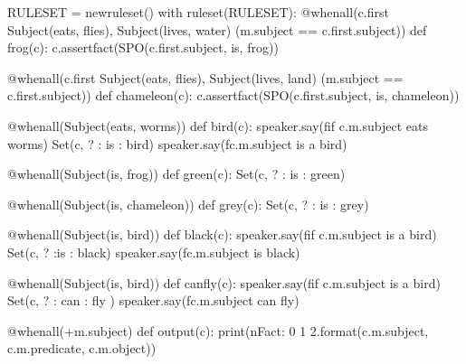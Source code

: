 \documentclass[letterpaper,10pt,english]{sphinxmanual}
\begin{document}
{
\begin{sphinxVerbatim}[commandchars=\\\{\}]
\llap{\color{nbsphinxin}[ ]:\,\hspace{\fboxrule}\hspace{\fboxsep}}RULESET = new\PYGZus{}ruleset()
with ruleset(RULESET):
    @when\PYGZus{}all(c.first \PYGZlt{}\PYGZlt{} Subject(\PYGZsq{}eats\PYGZsq{}, \PYGZsq{}flies\PYGZsq{}),
              Subject(\PYGZsq{}lives\PYGZsq{}, \PYGZsq{}water\PYGZsq{}) \PYGZam{} (m.subject == c.first.subject))
    def frog(c):
        c.assert\PYGZus{}fact(SPO(c.first.subject, \PYGZsq{}is\PYGZsq{}, \PYGZsq{}frog\PYGZsq{}))

    @when\PYGZus{}all(c.first \PYGZlt{}\PYGZlt{} Subject(\PYGZsq{}eats\PYGZsq{}, \PYGZsq{}flies\PYGZsq{}),
              Subject(\PYGZsq{}lives\PYGZsq{}, \PYGZsq{}land\PYGZsq{}) \PYGZam{} (m.subject == c.first.subject))
    def chameleon(c):
        c.assert\PYGZus{}fact(SPO(c.first.subject, \PYGZsq{}is\PYGZsq{}, \PYGZsq{}chameleon\PYGZsq{}))

    @when\PYGZus{}all(Subject(\PYGZsq{}eats\PYGZsq{}, \PYGZsq{}worms\PYGZsq{}))
    def bird(c):
        speaker.say(f\PYGZsq{}if \PYGZob{}c.m.subject\PYGZcb{} eats worms\PYGZsq{})
        Set(c, \PYGZsq{}? : is : bird\PYGZsq{})
        speaker.say(f\PYGZsq{}\PYGZob{}c.m.subject\PYGZcb{} is a bird\PYGZsq{})

    @when\PYGZus{}all(Subject(\PYGZsq{}is\PYGZsq{}, \PYGZsq{}frog\PYGZsq{}))
    def green(c):
        Set(c, \PYGZsq{}? : is : green\PYGZsq{})

    @when\PYGZus{}all(Subject(\PYGZsq{}is\PYGZsq{}, \PYGZsq{}chameleon\PYGZsq{}))
    def grey(c):
        Set(c, \PYGZsq{}? : is : grey\PYGZsq{})

    @when\PYGZus{}all(Subject(\PYGZsq{}is\PYGZsq{}, \PYGZsq{}bird\PYGZsq{}))
    def black(c):
        speaker.say(f\PYGZsq{}if \PYGZob{}c.m.subject\PYGZcb{} is a bird\PYGZsq{})
        Set(c, \PYGZsq{}? :is : black\PYGZsq{})
        speaker.say(f\PYGZsq{}\PYGZob{}c.m.subject\PYGZcb{} is black\PYGZsq{})

    @when\PYGZus{}all(Subject(\PYGZdq{}is\PYGZdq{}, \PYGZdq{}bird\PYGZdq{}))
    def can\PYGZus{}fly(c):
        speaker.say(f\PYGZsq{}if \PYGZob{}c.m.subject\PYGZcb{} is a bird\PYGZsq{})
        Set(c, \PYGZsq{}? : can : fly\PYGZsq{} )
        speaker.say(f\PYGZsq{}\PYGZob{}c.m.subject\PYGZcb{} can fly\PYGZsq{})

    @when\PYGZus{}all(+m.subject)
    def output(c):
        print(\PYGZsq{}\PYGZbs{}nFact: \PYGZob{}0\PYGZcb{} \PYGZob{}1\PYGZcb{} \PYGZob{}2\PYGZcb{}\PYGZsq{}.format(c.m.subject, c.m.predicate, c.m.object))
\end{sphinxVerbatim}
}
\end{document}
